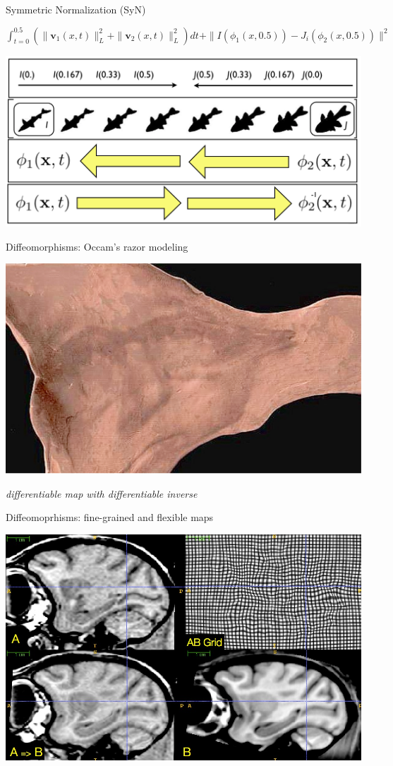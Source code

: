 \documentclass[ignorenonframetext,]{beamer}
\begin{document}
\begin{frame}{Symmetric Normalization (SyN)}

$\int_{t=0}^{0.5} \left(\|\mathbf{v}_1(x,t)\|_L^2 + \|\mathbf{v}_2(x,t)\|_L^2\right)dt + \|I\left(\phi_1(x,0.5)\right) - J_i\left(\phi_2(x,0.5)\right)\|^2$

\includegraphics{./Figs/fishes.png}

\end{frame}

\begin{frame}{Diffeomorphisms: Occam's razor modeling}

\includegraphics{./Figs/sillyputty.png}

\emph{differentiable map with differentiable inverse}

\end{frame}

\begin{frame}{Diffeomoprhisms: fine-grained and flexible maps}

\includegraphics{./Figs/highresdiffeos.jpg}

\end{frame}
\end{document}
